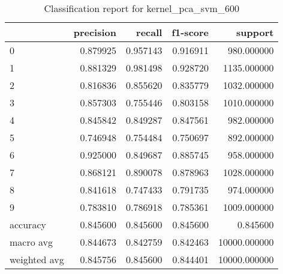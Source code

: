 \begin{table}[htb!]
\centering
\caption{Classification report for kernel_pca_svm_600}
\label{tab:classification-report-kernel_pca_svm_600}
\begin{tabular}{lrrrr}
\toprule
 & precision & recall & f1-score & support \\
\midrule
0 & 0.879925 & 0.957143 & 0.916911 & 980.000000 \\
1 & 0.881329 & 0.981498 & 0.928720 & 1135.000000 \\
2 & 0.816836 & 0.855620 & 0.835779 & 1032.000000 \\
3 & 0.857303 & 0.755446 & 0.803158 & 1010.000000 \\
4 & 0.845842 & 0.849287 & 0.847561 & 982.000000 \\
5 & 0.746948 & 0.754484 & 0.750697 & 892.000000 \\
6 & 0.925000 & 0.849687 & 0.885745 & 958.000000 \\
7 & 0.868121 & 0.890078 & 0.878963 & 1028.000000 \\
8 & 0.841618 & 0.747433 & 0.791735 & 974.000000 \\
9 & 0.783810 & 0.786918 & 0.785361 & 1009.000000 \\
accuracy & 0.845600 & 0.845600 & 0.845600 & 0.845600 \\
macro avg & 0.844673 & 0.842759 & 0.842463 & 10000.000000 \\
weighted avg & 0.845756 & 0.845600 & 0.844401 & 10000.000000 \\
\bottomrule
\end{tabular}
\end{table}
